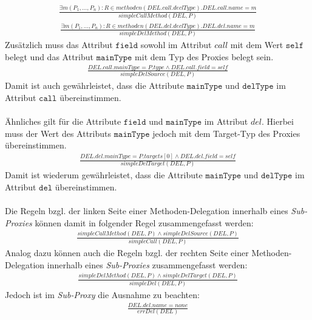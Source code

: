 \documentclass[a4paper,12pt]{article}
\begin{document}
\begin{gather*}
\frac{\exists m(P_1,...,P_n):R \in \mathit{methoden(DEL.call.declType)}. \mathit{DEL.call.name} = m}
{\mathit{simpleCallMethod(DEL, P)}}
\end{gather*}
\begin{gather*}
\frac{\exists m(P_1,...,P_n):R \in \mathit{methoden(DEL.del.declType)}. \mathit{DEL.del.name} = m}
{\mathit{simpleDelMethod(DEL, P)}}
\end{gather*}
Zusätzlich muss das Attribut $\texttt{field}$ sowohl im Attribut $call$ mit dem Wert $\texttt{self}$ belegt und das Attribut $\texttt{mainType}$ mit dem Typ des Proxies belegt sein.
\begin{gather*}
\frac{\mathit{DEL.call.mainType} = \mathit{P.type} \wedge \mathit{DEL.call.field} = \mathit{self}}
{\mathit{simpleDelSource(DEL, P)}}
\end{gather*}
Damit ist auch gewährleistet, dass die Attribute $\texttt{mainType}$ und $\texttt{delType}$ im Attribut $\texttt{call}$ übereinstimmen.\\\\
Ähnliches gilt für die Attribute $\texttt{field}$ und $\texttt{mainType}$ im Attribut $del$. Hierbei muss der Wert des Attributs $\texttt{mainType}$ jedoch mit dem Target-Typ des Proxies übereinstimmen.
\begin{gather*}
\frac{\mathit{DEL.del.mainType} = \mathit{P.targets[0]}\wedge \mathit{DEL.del.field} = \mathit{self}}
{\mathit{simpleDelTarget(DEL, P)}}
\end{gather*}
Damit ist wiederum gewährleistet, dass die Attribute $\texttt{mainType}$ und $\texttt{delType}$ im Attribut $\texttt{del}$ übereinstimmen.\\\\
Die Regeln bzgl. der linken Seite einer Methoden-Delegation innerhalb eines \emph{Sub-Proxies} können damit in folgender Regel zusammengefasst werden:
\begin{gather*}
\frac{\mathit{simpleCallMethod(DEL,P)} \wedge \mathit{simpleDelSource(DEL,P)}}
{simpleCall(DEL,P)}
\end{gather*}
Analog dazu können auch die Regeln bzgl. der rechten Seite einer Methoden-Delegation innerhalb eines \emph{Sub-Proxies} zusammengefasst werden:
\begin{gather*}
\frac{\mathit{simpleDelMethod(DEL,P)} \wedge \mathit{simpleDelTarget(DEL,P)}}
{simpleDel(DEL,P)}
\end{gather*}
Jedoch ist im \emph{Sub-Proxy} die Ausnahme zu beachten:
\begin{gather*}
\frac{\mathit{DEL.del.name} = \mathit{none}}
{\mathit{errDel(DEL)}}
\end{gather*}
\end{document}

